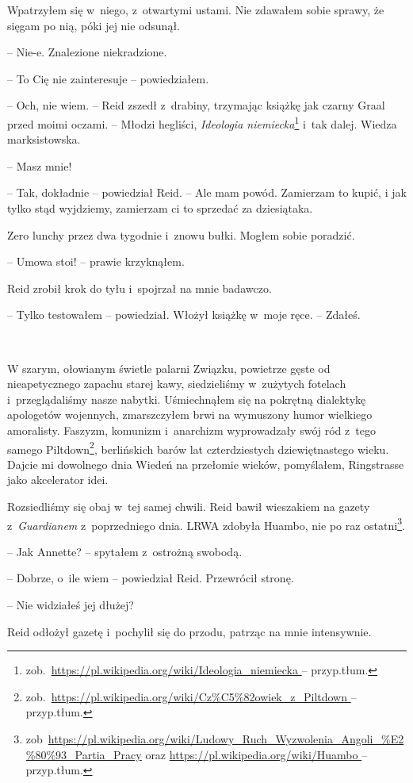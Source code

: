 \documentclass[oneside,polish,11pt,sfheadings]{mwbk}
\begin{document}
Wpatrzyłem się w~niego, z~otwartymi ustami. Nie zdawałem sobie sprawy,
że sięgam po nią, póki jej nie odsunął. 

-- Nie-e. Znalezione niekradzione.

-- To Cię nie zainteresuje -- powiedziałem.

-- Och, nie wiem. -- Reid zszedł z~drabiny, trzymając książkę jak czarny
Graal przed moimi oczami. -- Młodzi hegliści, \emph{Ideologia
niemiecka}\footnote{
zob.~\url{https://pl.wikipedia.org/wiki/Ideologia_niemiecka
} -- przyp.tłum.} i~tak dalej. Wiedza marksistowska.

-- Masz mnie!

-- Tak, dokładnie -- powiedział Reid. -- Ale mam powód. Zamierzam to kupić,
i jak tylko stąd wyjdziemy, zamierzam ci to sprzedać za dziesiątaka.

Zero lunchy przez dwa tygodnie i~znowu bułki. Mogłem sobie poradzić.

-- Umowa stoi! -- prawie krzyknąłem.

Reid zrobił krok do tyłu i~spojrzał na mnie badawczo.

-- Tylko testowałem -- powiedział. Włożył książkę w~moje ręce. -- Zdałeś.

~

W szarym, ołowianym świetle palarni Związku, powietrze gęste od
nieapetycznego zapachu starej kawy, siedzieliśmy w~zużytych fotelach i~przeglądaliśmy nasze nabytki. Uśmiechnąłem się na pokrętną dialektykę
apologetów wojennych, zmarszczyłem brwi na wymuszony humor wielkiego
amoralisty. Faszyzm, komunizm i~anarchizm wyprowadzały swój ród z~tego
samego Piltdown\footnote{
zob.~\url{https://pl.wikipedia.org/wiki/Cz\%C5\%82owiek_z_Piltdown
} -- przyp.tłum.}, berlińskich barów lat czterdziestych dziewiętnastego
wieku. Dajcie mi dowolnego dnia Wiedeń na przełomie wieków, pomyślałem,
Ringstrasse jako akcelerator idei.

Rozsiedliśmy się obaj w~tej samej chwili. Reid bawił wieszakiem na
gazety z~\emph{Guardianem} z~poprzedniego dnia. LRWA zdobyła Huambo, nie
po raz ostatni\footnote{zob~\url{https://pl.wikipedia.org/wiki/Ludowy_Ruch_Wyzwolenia_Angoli_\%E2\%80\%93_Partia_Pracy}
oraz \url{https://pl.wikipedia.org/wiki/Huambo } -- przyp.tłum.}.

-- Jak Annette? -- spytałem z~ostrożną swobodą.

-- Dobrze, o~ile wiem -- powiedział Reid. Przewrócił stronę.

-- Nie widziałeś jej dłużej?

Reid odłożył gazetę i~pochylił się do przodu, patrząc na mnie
intensywnie. 
\end{document}
